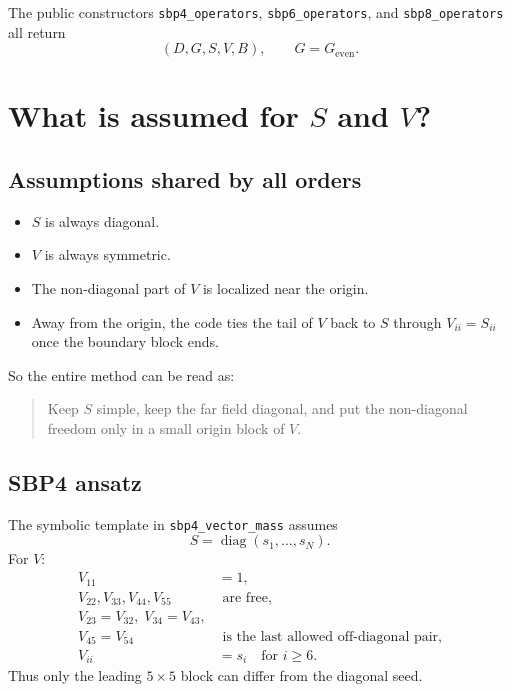 \documentclass[
  aps,
  pre,
  reprint,
  superscriptaddress,
  nofootinbib
]{revtex4-2}
\newcommand{\diag}{\operatorname{diag}}
\begin{document}
The public constructors
\texttt{sbp4\_operators}, \texttt{sbp6\_operators}, and \texttt{sbp8\_operators}
all return
\begin{equation}
  (D,G,S,V,B), \qquad G = G_{\mathrm{even}}.
\end{equation}

\section{What is assumed for \texorpdfstring{$S$}{S} and \texorpdfstring{$V$}{V}?}
\subsection{Assumptions shared by all orders}
\begin{itemize}
  \item $S$ is always diagonal.
  \item $V$ is always symmetric.
  \item The non-diagonal part of $V$ is localized near the origin.
  \item Away from the origin, the code ties the tail of $V$ back to $S$ through
  $V_{ii}=S_{ii}$ once the boundary block ends.
\end{itemize}

So the entire method can be read as:
\begin{quote}
Keep $S$ simple, keep the far field diagonal, and put the non-diagonal freedom only in a
small origin block of $V$.
\end{quote}

\subsection{SBP4 ansatz}
The symbolic template in \texttt{sbp4\_vector\_mass} assumes
\begin{equation}
  S = \diag(s_1,\dots,s_N).
\end{equation}
For $V$:
\begin{align}
  V_{11} &= 1, \\
  V_{22},V_{33},V_{44},V_{55} &\text{ are free}, \\
  V_{23}=V_{32},\;
  V_{34}=V_{43}, \\
  V_{45}=V_{54} &\text{ is the last allowed off-diagonal pair}, \\
  V_{ii} &= s_i \quad \text{for } i \ge 6.
\end{align}
Thus only the leading $5 \times 5$ block can differ from the diagonal seed.
\end{document}
